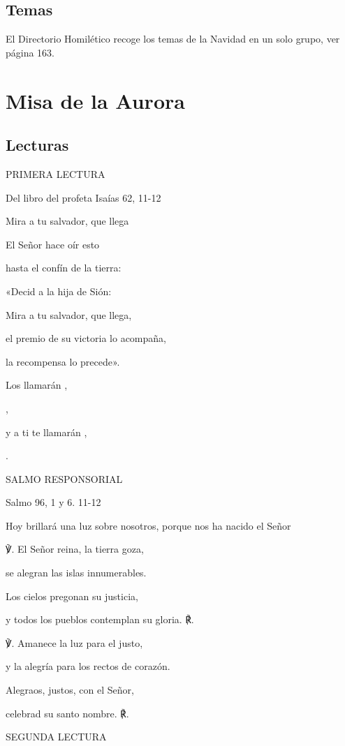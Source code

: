 \begin{body}
\begin{body}
\section{Temas}

El Directorio Homilético recoge los temas de la Navidad en un solo
grupo, ver página 163.

\chapter{Misa de la Aurora}

\section{Lecturas}

PRIMERA LECTURA

Del libro del profeta Isaías 62, 11-12

Mira a tu salvador, que llega

El Señor hace oír esto

hasta el confín de la tierra:

«Decid a la hija de Sión:

Mira a tu salvador, que llega,

el premio de su victoria lo acompaña,

la recompensa lo precede».

Los llamarán ,

,

y a ti te llamarán ,

.

SALMO RESPONSORIAL

Salmo 96, 1 y 6. 11-12

Hoy brillará una luz sobre nosotros, porque nos ha nacido el Señor

℣. El Señor reina, la tierra goza,

se alegran las islas innumerables.

Los cielos pregonan su justicia,

y todos los pueblos contemplan su gloria. ℟.

℣. Amanece la luz para el justo,

y la alegría para los rectos de corazón.

Alegraos, justos, con el Señor,

celebrad su santo nombre. ℟.

SEGUNDA LECTURA


\end{body}
\end{body}
